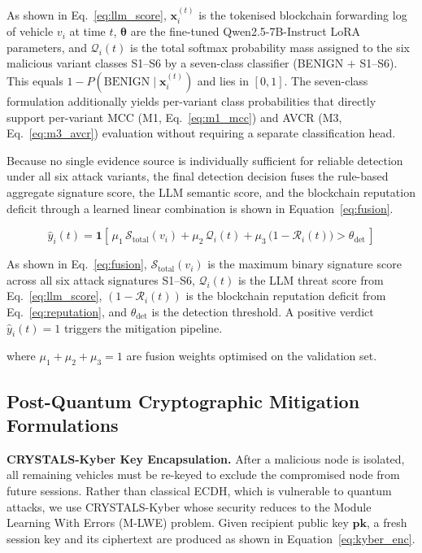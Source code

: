 \documentclass[12pt, a4paper]{report}
\begin{document}
As shown in Eq.~\eqref{eq:llm_score}, $\mathbf{x}_i^{(t)}$ is the
tokenised blockchain forwarding log of vehicle $v_i$ at time $t$,
$\boldsymbol{\theta}$ are the fine-tuned Qwen2.5-7B-Instruct LoRA
parameters, and $\mathcal{Q}_i(t)$ is the total softmax probability
mass assigned to the six malicious variant classes S1--S6 by a
seven-class classifier (BENIGN $+$ S1--S6). This equals $1 -
P(\mathrm{BENIGN}\mid\mathbf{x}_i^{(t)})$ and lies in $[0,1]$. The
seven-class formulation additionally yields per-variant class
probabilities that directly support per-variant MCC (M1,
Eq.~\eqref{eq:m1_mcc}) and AVCR (M3, Eq.~\eqref{eq:m3_avcr})
evaluation without requiring a separate classification head.

Because no single evidence source is individually sufficient for reliable
detection under all six attack variants, the final detection decision fuses
the rule-based aggregate signature score, the LLM semantic score, and the
blockchain reputation deficit through a learned linear combination is shown in Equation~\eqref{eq:fusion}.

\begin{equation}
\label{eq:fusion}
\hat{y}_i(t) = \mathbf{1}\!\left[\,
\mu_1\,\mathcal{S}_{\mathrm{total}}(v_i)
+ \mu_2\,\mathcal{Q}_i(t)
+ \mu_3\,\bigl(1 - \mathcal{R}_i(t)\bigr)
> \theta_{\mathrm{det}}
\,\right]
\end{equation}

As shown in Eq.~\eqref{eq:fusion}, $\mathcal{S}_{\mathrm{total}}(v_i)$ 
is the maximum binary signature score across all six attack signatures 
S1--S6, $\mathcal{Q}_i(t)$ is the LLM threat score from 
Eq.~\eqref{eq:llm_score}, $(1 - \mathcal{R}_i(t))$ is the blockchain 
reputation deficit from Eq.~\eqref{eq:reputation}, and 
$\theta_{\mathrm{det}}$ is the detection threshold. A positive verdict 
$\hat{y}_i(t) = 1$ triggers the mitigation pipeline.

\noindent where $\mu_1 + \mu_2 + \mu_3 = 1$ are fusion weights
optimised on the validation set.

\subsection{Post-Quantum Cryptographic Mitigation Formulations}

\textbf{CRYSTALS-Kyber Key Encapsulation.}
After a malicious node is isolated, all remaining vehicles must be re-keyed to
exclude the compromised node from future sessions. Rather than classical ECDH,
which is vulnerable to quantum attacks, we use CRYSTALS-Kyber whose security
reduces to the Module Learning With Errors (M-LWE) problem. Given recipient
public key $\mathbf{pk}$, a fresh session key and its ciphertext are produced as shown in Equation~\eqref{eq:kyber_enc}.
\end{document}
